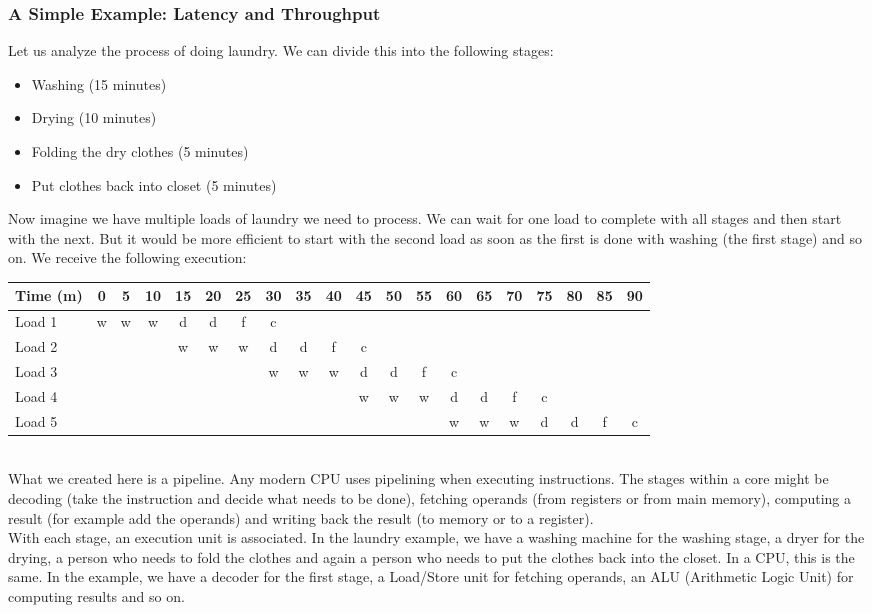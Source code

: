 \documentclass[main.tex]{subfiles}
\begin{document}
\subsubsection{A Simple Example: Latency and Throughput}
Let us analyze the process of doing laundry. We can divide this into the following stages:
\begin{itemize}
  \item Washing (15 minutes)
  \item Drying (10 minutes)
  \item Folding the dry clothes (5 minutes)
  \item Put clothes back into closet (5 minutes)
\end{itemize}
Now imagine we have multiple loads of laundry we need to process. We can wait for one load to complete with all stages and then start with the next. But it would be more efficient to start with the second load as soon as the first is done with washing (the first stage) and so on. We receive the following execution:\\[3mm]
\begin{tabular}{l | *{19}{c}}
    Time (m) & 0 & 5 & 10 & 15 & 20 & 25 & 30 & 35 & 40 & 45 & 50 & 55 & 60 & 65 & 70 & 75 & 80 & 85 & 90 \\
    \hline
    Load 1 & w & w & w & d & d & f & c\\
    Load 2 &   &   &   & w & w & w & d & d & f & c\\
    Load 3 &   &   &   &   &   &   & w & w & w & d & d & f & c \\
    Load 4 &   &   &   &   &   &   &   &   &   & w & w & w & d & d & f & c \\
    Load 5 &   &   &   &   &   &   &   &   &   &   &   &   & w & w & w & d & d & f & c
\end{tabular} \\[3mm]
What we created here is a pipeline. Any modern CPU uses pipelining when executing instructions. The stages within a core might be decoding (take the instruction and decide what needs to be done), fetching operands (from registers or from main memory), computing a result (for example add the operands) and writing back the result (to memory or to a register).\\
With each stage, an execution unit is associated. In the laundry example, we have a washing machine for the washing stage, a dryer for the drying, a person who needs to fold the clothes and again a person who needs to put the clothes back into the closet. In a CPU, this is the same. In the example, we have a decoder for the first stage, a Load/Store unit for fetching operands, an ALU (Arithmetic Logic Unit) for computing results and so on.\\
\end{document}
